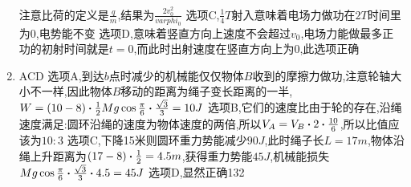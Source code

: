 \begin{enumerate}
            注意比荷的定义是$\frac{q}{m}$,结果为$\frac{2v_{0}^{2}}{varphi_{0}}$     \newline 
            选项C,$\frac{1}{4}T$射入意味着电场力做功在$2T$时间里为0,电势能不变     \newline
            选项D,意味着竖直方向上速度不会超过$v_{0}$,电场力能做最多正功的初射时间就是$t=0$,而此时出射速度在竖直方向上为0,此选项正确 
            \item ACD   \newline
            选项A,到达$b$点时减少的机械能仅仅物体$B$收到的摩擦力做功,注意轮轴大小不一样,因此物体$B$移动的距离为绳子变长距离的一半,$ W = (10 - 8) \vdot \frac{1}{2} Mg \cos{\frac{\pi}{6}} \vdot \frac{\sqrt{3}}{3} = 10 J$     \newline 
            选项B,它们的速度比由于轮的存在,沿绳速度满足:圆环沿绳的速度为物体速度的两倍,所以$ V_{A} = V_{B} \vdot 2 \vdot \frac{10}{6}$,所以比值应该为$ 10:3 $   \newline 
            选项C,下降15米则圆环重力势能减少$90J$,此时绳子长$L = 17 m$,物体沿绳上升距离为$(17-8) \vdot \frac{1}{2} = 4.5  m$,获得重力势能$ 45J $,机械能损失$ Mg\cos{\frac{\pi}{6}} \vdot \frac{\sqrt{3}}{3} \vdot  4.5  = 45J $       \newline 
            选项D,显然正确132
        \end{enumerate}

